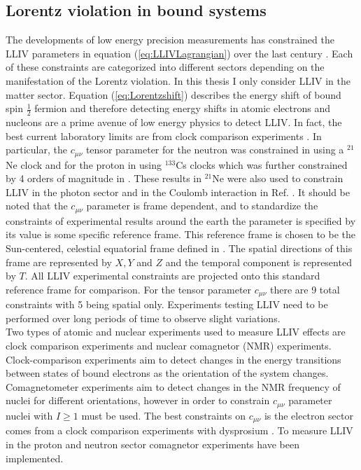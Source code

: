 \documentclass[10pt,a4paper, twoside, openright]{report}
\begin{document}
\subsection{Lorentz violation in bound systems} \label{sec:LorentzBound}
The developments of low energy precision measurements has constrained the LLIV parameters in equation (\ref{eq:LLIVLagrangian}) over the last  century \cite{LorentzDataTables2019}. Each of these constraints are categorized into different sectors depending on the manifestation of the Lorentz violation.  In this thesis I only consider LLIV in the matter sector. Equation (\ref{eq:Lorentzshift}) describes the energy shift of bound spin $\tfrac{1}{2}$ fermion and therefore detecting energy shifts in atomic electrons and nucleons are a prime avenue of low energy physics to detect LLIV. In fact, the best current laboratory limits are from clock comparison experiments \cite{Prestage1985, Chupp1989, Hohensee2013, Dzuba2016}. In particular, the $c_{\mu\nu}$ tensor parameter for the neutron was constrained in \cite{Smiciklas2011} using a $^{21}$Ne clock and for the proton in \cite{Wolf2006} using $^{133}$Cs clocks which was further constrained by 4 orders of magnitude in \cite{Flambaum2016}. These results in $^{21}$Ne were also used to constrain LLIV in the photon sector and in the Coulomb interaction in  Ref. \cite{FlambaumRomalis2017} . It should be noted that the $c_{\mu\nu}$ parameter is frame dependent, and to standardize the constraints of experimental results around the earth the parameter is specified by its value is some specific reference frame. This reference frame is chosen to be the Sun-centered, celestial equatorial frame defined in \cite{LorentzDataTables2019, Bluhm2002}. The spatial directions of this frame are represented by $X,Y$ and $Z$ and the temporal component is represented by $T$. All LLIV experimental constraints are projected onto this standard reference frame for comparison. For the tensor parameter $c_{\mu\nu}$ there are 9 total constraints with 5 being spatial only. Experiments testing LLIV need to be performed over long periods of time to observe slight variations.\\
\linebreak
Two types of atomic and nuclear experiments used to measure LLIV effects are clock comparison experiments and nuclear comagnetor (NMR) experiments. Clock-comparison experiments aim to detect changes in the energy transitions between states of bound electrons as the orientation of the system changes. Comagnetometer experiments aim to detect changes in the NMR frequency of nuclei for different orientations, however in order to constrain $c_{\mu\nu}$ parameter nuclei with $I\geq 1$ must be used. The best constraints on $c_{\mu\nu}$ is the electron sector comes from a clock comparison experiments with dysprosium \cite{Hohensee2013}. To measure LLIV in the proton and neutron sector comagnetor experiments have been implemented. \\
\end{document}
